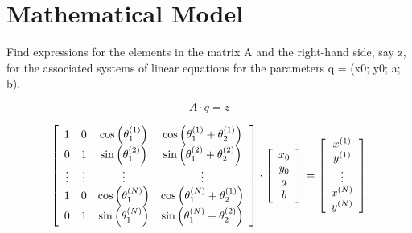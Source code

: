 \section{Mathematical Model}
Find expressions for the elements in the matrix A and the right-hand
side, say z, for the associated systems of linear equations for the parameters q = (x0; y0; a; b).


\begin{equation}
A \cdot q = z
\end{equation}

\begin{equation}
\left[
\begin{array}{c c c c}
1 & 0 & \cos\left( \theta_1^{(1)}\right)  & \cos\left(\theta_1^{(1)} + \theta_2^{(1)} \right) \\
0 & 1 & \sin\left(\theta_1^{(2)}\right)  & \sin\left(\theta_1^{(2)} + \theta_2^{(2)}\right)  \\
\vdots & \vdots & \vdots & \vdots \\
1 & 0 & \cos\left(\theta_1^{(N)}\right)  & \cos\left(\theta_1^{(N)} + \theta_2^{(1)}\right)  \\
0 & 1 & \sin\left(\theta_1^{(N)}\right)  & \sin\left(\theta_1^{(N)} + \theta_2^{(2)}\right)  \\
\end{array}
\right]
\cdot
\left[
\begin{array}{c}
x_0 \\
y_0 \\
a \\
b \\
\end{array}
\right]
=
\left[
\begin{array}{c}
x^{(1)} \\
y^{(1)} \\
\vdots \\
x^{(N)} \\
y^{(N)} \\
\end{array}
\right]
\end{equation}